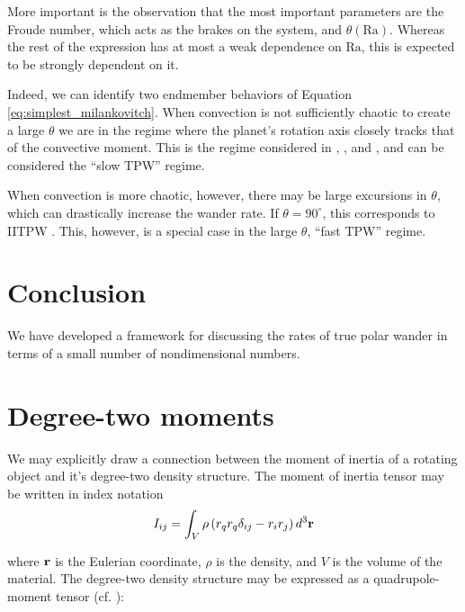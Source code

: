 \documentclass[extra,mreferee]{gji}
\begin{document}
More important is the observation that the most important parameters are the Froude number, which acts as the brakes on the system, and $\theta(\mathrm{Ra})$.
Whereas the rest of the expression has at most a weak dependence on $\mathrm{Ra}$, this is expected to be strongly dependent on it.

Indeed, we can identify two endmember behaviors of Equation \ref{eq:simplest_milankovitch}.
When convection is not sufficiently chaotic to create a large $\theta$ we are in the regime where the planet's rotation axis closely tracks that of the convective moment.
This is the regime considered in \citet{steinberger1997changes}, \citet{roberts2007cause}, and \citet{zhong2007supercontinent}, and can be considered the ``slow TPW'' regime.

When convection is more chaotic, however, there may be large excursions in $\theta$, which can drastically increase the wander rate.  
If $\theta=90^\circ$, this corresponds to IITPW \citep{kirschvink1997evidence}.  
This, however, is a special case in the large $\theta$, ``fast TPW'' regime.



\section{Conclusion}
We have developed a framework for discussing the rates of true polar wander in terms of a small number of nondimensional numbers.


\begin{acknowledgments}
\end{acknowledgments}





\appendix

\section{Degree-two moments}
\label{appendix:moments}

We may explicitly draw a connection between the moment of inertia of a rotating object and it's degree-two density structure.  The moment of inertia tensor may be written in index notation
\begin{equation}
I_{ij} = \int_V \rho \left( r_q r_q \delta_{ij} - r_i r_j \right) d^3 {\bf r}
\label{inertia}
\end{equation}

where $\bf r$ is the Eulerian coordinate, $\rho$ is the density, and $V$ is the volume of the material.  The degree-two density structure may be expressed as a quadrupole-moment tensor (cf. \citet{jackson1998classical}):
\end{document}
